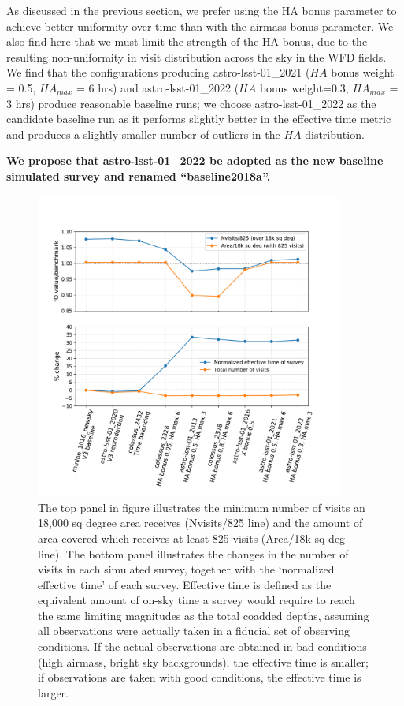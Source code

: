 \documentclass[DM,lsstdraft,authoryear,toc]{lsstdoc}
\begin{document}
As discussed in the previous section, we prefer using the HA bonus parameter to achieve better uniformity over time than with the airmass bonus parameter. We also find here that we must limit the strength of the HA bonus, due to the resulting non-uniformity in visit distribution across the sky in the WFD fields. We find that the configurations producing astro-lsst-01\_2021 ($HA$ bonus weight = 0.5, $HA_{max}$  = 6 hrs) and astro-lsst-01\_2022 ($HA$ bonus weight=0.3, $HA_{max}$ = 3 hrs) produce reasonable baseline runs; we choose astro-lsst-01\_2022 as the candidate baseline run as it performs slightly better in the effective time metric and produces a slightly smaller number of outliers in the $HA$ distribution. 

\textbf{We propose that astro-lsst-01\_2022 be adopted as the new baseline simulated survey and renamed ``baseline2018a''.}


\begin{figure}[ht]
\centering
\includegraphics[width=0.9\textwidth]{figures/srd}
\caption{The top panel in figure illustrates the minimum number of visits an 18,000 sq degree area receives (Nvisits/825 line) and the amount of area covered which receives at least 825 visits (Area/18k sq deg line).  The bottom panel illustrates the changes in the number of visits in each simulated survey, together with the `normalized effective time' of each survey. Effective time is defined as the equivalent amount of on-sky time a survey would require to reach the same limiting magnitudes as the total coadded depths, assuming all observations were actually taken in a fiducial set of observing conditions. If the actual observations are obtained in bad conditions (high airmass, bright sky backgrounds), the effective time is smaller; if observations are taken with good conditions, the effective time is larger.
\label{fig:srd}}
\end{figure}
\end{document}
